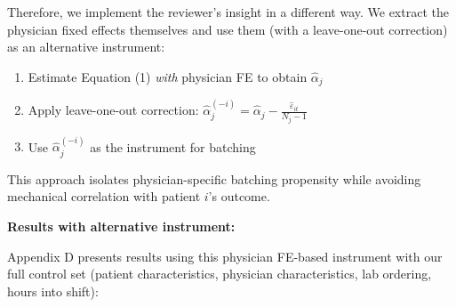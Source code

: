 \documentclass[11pt]{article}
\newcommand{\1}{\hbox{\rm 1\kern-.35em 1}}
\begin{document}
Therefore, we implement the reviewer's insight in a different way. We extract the physician fixed effects themselves and use them (with a leave-one-out correction) as an alternative instrument:
\begin{enumerate}
\item Estimate Equation (1) \textit{with} physician FE to obtain $\hat{\alpha}_j$
\item Apply leave-one-out correction: $\hat{\alpha}_j^{(-i)} = \hat{\alpha}_j - \frac{\hat{\varepsilon}_{it}}{N_j - 1}$
\item Use $\hat{\alpha}_j^{(-i)}$ as the instrument for batching
\end{enumerate}
This approach isolates physician-specific batching propensity while avoiding mechanical correlation with patient $i$'s outcome.

\textbf{Results with alternative instrument:}

Appendix D presents results using this physician FE-based instrument with our full control set (patient characteristics, physician characteristics, lab ordering, hours into shift):
\end{document}
